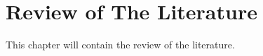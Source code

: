 \chapter{Review of The Literature} \label{chap:lit}

This chapter will contain the review of the literature. \bigskip
